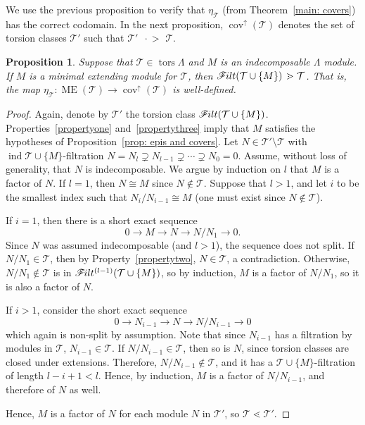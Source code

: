 \documentclass[10pt]{amsart}
\providecommand{\1}{}
\DeclareMathOperator{\tors}{tors}
\DeclareMathOperator{\ME}{ME}%
\DeclareMathOperator{\ind}{ind}
\DeclareMathOperator{\cov}{cov}
\newcommand{\calT}{\mathcal{T}}
\newcommand{\filt}{\mathscr{F}\Mk ilt}
\newcommand{\covers}{{\,\,\,\cdot\!\!\!\! >\,\,}}
\newcommand{\covup}{\cov^{\uparrow}}
\renewcommand{\1}{\hat{1}}
\newcommand{\0}{\hat{0}}
\newcommand*{\Mk}{\mkern -2mu}
\newtheorem{proposition}[theorem]{Proposition}
\theoremstyle{definition}
\begin{document}
We use the previous proposition to verify that $\eta_\calT$ (from Theorem~\ref{main: covers}) has the correct codomain.
In the next proposition, $\covup(\calT)$ denotes the set of torsion classes $\calT'$ such that $\calT' \covers \calT$.
\begin{proposition}\label{thm:pseudo-minimal-covers}
Suppose that $\calT\in \tors \Lambda$ and $M$ is an indecomposable $\Lambda$ module.
If $M$ is a minimal extending module for $\calT$, then $\filt(\calT \cup \{M\})\covers \calT$.
That is, the map $\eta_\calT: \ME(\calT) \to \covup(\calT)$ is well-defined.
\end{proposition}
\begin{proof}
Again, denote by $\calT'$ the torsion class $\filt(\calT\cup \{M\})$. 
Properties~\ref{propertyone} and~\ref{propertythree} imply that $M$ satisfies the hypotheses of Proposition~\ref{prop: epis and covers}.
Let $N\in \calT' \setminus \calT$ with $\ind \calT \cup \{M\}$-filtration $N=N_l\supsetneq N_{l-1} \supsetneq \cdots
 \supsetneq N_0=0$. Assume, without loss of generality, that $N$ is indecomposable. 
We argue by induction on $l$ that $M$ is a factor of $N$.
If $l=1$, then $N\cong M$ since $N\notin \calT$.
Suppose that $l>1$, and let $i$ to be the smallest index such that $N_i/N_{i-1} \cong M$ (one must exist since $N\notin
 \calT$).

If $i=1$, then there is a short exact sequence 
\[0 \rightarrow M \rightarrow N \rightarrow N/N_1 \rightarrow 0.\]
Since $N$ was assumed indecomposable (and $l>1$), the sequence does
not split.
If $N/N_1 \in \calT$, then by Property~\ref{propertytwo}, $N\in
\calT$, a contradiction.
Otherwise, $N/N_1 \not\in \calT$ is in $\filt^{(l-1)}(\calT\cup \{M\})$,
so by induction, $M$ is a factor of $N/N_1$, so it is also a factor of
$N$. 

If $i>1$, consider the short exact sequence 
\[0 \rightarrow N_{i-1} \rightarrow N \rightarrow N/N_{i-1} \rightarrow 0\]
which again is non-split by assumption.
Note that since $N_{i-1}$ has a filtration by modules in $\calT$, $N_{i-1}\in
\calT$. 
If $N/N_{i-1}\in \calT$, then so is $N$, since torsion classes are
closed under extensions. 
Therefore, $N/N_{i-1} \notin \calT$, and it has a
$\calT\cup\{M\}$-filtration of length $l-i+1<l$.
Hence, by induction, $M$ is a factor of $N/N_{i-1}$, and therefore of $N$ as well. 

Hence, $M$ is a factor of $N$ for each module $N$ in
$\calT'$, so $\calT\lessdot \calT'$. 
\end{proof}
\end{document}
